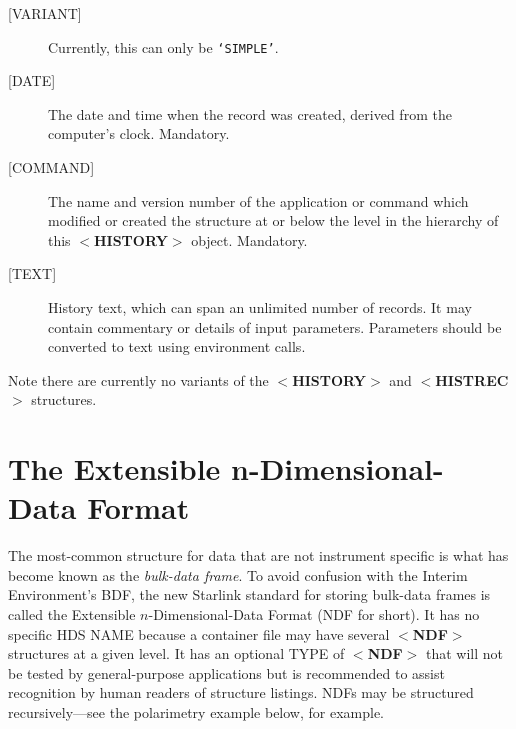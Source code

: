\documentclass[twoside,11pt]{article}
\newcommand{\xlabel}[1]{}
\renewcommand{\_}{\texttt{\symbol{95}}}
\begin{document}
\begin{description}
\item [{[}VARIANT{]}]
Currently, this can only be {\tt `SIMPLE'}.
\item [{[}DATE{]}]
The date and time when the record was created, derived from the
computer's clock.  Mandatory.
\item [{[}COMMAND{]}]
The name and version number of the application or command
which modified or created the structure at
or below the level in the hierarchy of this
$<${\bf HISTORY}$>$ object.  Mandatory.
\item [{[}TEXT{]}]  History text, which can span an
unlimited number of records.  It may
contain commentary or details of input parameters.  Parameters should be
converted to text using environment calls.
\end{description}

Note there are currently no variants
of the $<${\bf HISTORY}$>$ and $<${\bf HIST\_REC}$>$
structures.

\xlabel{se_ndf}\section{The Extensible n-Dimensional-Data Format\label{se:ndf}}

The most-common structure for data that are not instrument specific is
what has become known as the {\it bulk-data frame}.  To avoid
confusion with the Interim Environment's BDF,
the new Starlink standard for storing bulk-data frames
is called the Extensible $n$-Dimensional-Data Format (NDF for short).
It has no specific HDS NAME because a container file may
have several $<${\bf NDF}$>$ structures at a given level.  It
has an optional
TYPE of $<${\bf NDF}$>$ that will not be tested by general-purpose
applications but is recommended to assist
recognition by human readers of structure listings.
NDFs may be structured recursively---see the 
polarimetry example below, for example.
\end{document}
